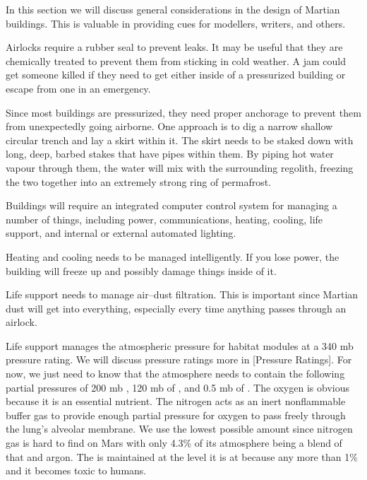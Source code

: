 

In this section we will discuss general considerations in the design of Martian buildings. This is valuable in providing cues for modellers, writers, and others.

Airlocks require a rubber seal to prevent leaks. It may be useful that they are chemically treated to prevent them from sticking in cold weather. A jam could get someone killed if they need to get either inside of a pressurized building or escape from one in an emergency.

Since most buildings are pressurized, they need proper anchorage to prevent them from unexpectedly going airborne. One approach is to dig a narrow shallow circular trench and lay a skirt within it. The skirt needs to be staked down with long, deep, barbed stakes that have pipes within them. By piping hot water vapour through them, the water will mix with the surrounding regolith, freezing the two together into an extremely strong ring of permafrost. 

Buildings will require an integrated computer control system for managing a number of things, including power, communications, heating, cooling, life support, and internal or external automated lighting.

Heating and cooling needs to be managed intelligently. If you lose power, the building will freeze up and possibly damage things inside of it.

Life support needs to manage air--dust filtration. This is important since Martian dust will get into everything, especially every time anything passes through an airlock. 

Life support manages the atmospheric pressure for habitat modules at a 340 mb pressure rating. We will discuss pressure ratings more in [Pressure Ratings]. For now, we just need to know that the atmosphere needs to contain the following partial pressures of 200 mb , 120 mb of , and 0.5 mb of . The oxygen is obvious because it is an essential nutrient. The nitrogen acts as an inert nonflammable buffer gas to provide enough partial pressure for oxygen to pass freely through the lung's alveolar membrane. We use the lowest possible amount since nitrogen gas is hard to find on Mars with only 4.3\% of its atmosphere being a blend of that and argon. The  is maintained at the level it is at because any more than 1\% and it becomes toxic to humans.

